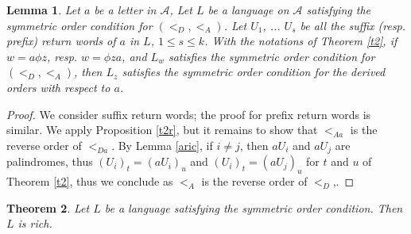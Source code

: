 \documentclass[12pt,a4paper]{amsart}
\newtheorem{theorem}{Theorem}
\newtheorem{lemma}[theorem]{Lemma}
\begin{document}
\begin{lemma}\label{bric} Let $a$ be a letter in $\mathcal A$, Let $L$ be a language on $\mathcal A$ satisfying the symmetric order condition for  $(<_D,<_A)$. Let  $U_1$, ... $U_s$ be 
all the suffix (resp. prefix) return words of $a$ in $L$, $1\leq s \leq k$. With the notations of Theorem \ref{t2}, 
if $w=a\phi z$, resp. $w=\phi z a$, and  $L_w$ satisfies the symmetric order condition for  $(<_D,<_A)$,  then $L_z$ satisfies the symmetric order condition for the derived orders with respect to $a$. \end{lemma}
\begin{proof}
We consider suffix return words; the proof for prefix return words is similar. We apply Proposition \ref{t2r}, but it remains to show  that $<_{Aa}$ is the reverse order of $<_{Da}$. By Lemma \ref{aric}, if $i\neq j$, then $aU_i$ and $aU_j$ are palindromes, 
thus $(U_i)_t=(aU_i)_u$ and $(U_i)_t=(aU_j)_u$ for $t$ and $u$ of Theorem \ref{t2}, thus we conclude as $<_{A}$ is the reverse order of $<_{D}$,.\end{proof}



\begin{theorem} \label{rich} Let $L$ be a language satisfying the  symmetric order condition. Then $L$ is rich. \end{theorem}
\end{document}
